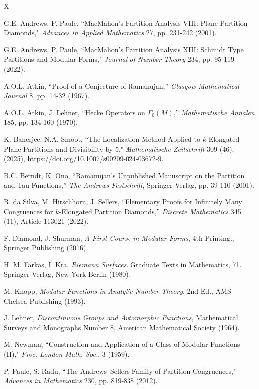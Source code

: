 \documentclass[reqno]{amsart}
\theoremstyle{definition}
\theoremstyle{remark}
\numberwithin{equation}{section}
\begin{document}
\begin{thebibliography}{X}

 G.E. Andrews, P. Paule, ``MacMahon's Partition Analysis VIII: Plane Partition Diamonds," \textit{Advances in Applied Mathematics} 27, pp. 231-242 (2001).

 G.E. Andrews, P. Paule, ``MacMahon's Partition Analysis XIII: Schmidt Type Partitions and Modular Forms," \textit{Journal of Number Theory} 234, pp. 95-119 (2022).

 A.O.L. Atkin, ``Proof of a Conjecture of Ramanujan,'' \textit{Glasgow Mathematical Journal} 8, pp. 14-32 (1967).

 A.O.L. Atkin, J. Lehner, ``Hecke Operators on $\Gamma_0(M)$,'' \textit{Mathematische Annalen} 185, pp. 134-160 (1970).

 K. Banerjee, N.A. Smoot, ``The Localization Method Applied to $k$-Elongated Plane Partitions and Divisibility by 5," \textit{Mathematische Zeitschrift} 309 (46), (2025), \url{https://doi.org/10.1007/s00209-024-03672-9}.

 B.C. Berndt, K. Ono, ``Ramanujan's Unpublished Manuscript on the Partition and Tau Functions,'' \textit{The Andrews Festschrift}, Springer-Verlag, pp. 39-110 (2001).

 R. da Silva, M. Hirschhorn, J. Sellers, ``Elementary Proofs for Infinitely Many Congruences for $k$-Elongated Partition Diamonds,'' \textit{Discrete Mathematics} 345 (11), Article 113021 (2022).

 F. Diamond, J. Shurman, \textit{A First Course in Modular Forms}, 4th Printing., Springer Publishing (2016).

 H. M. Farkas, I. Kra, \textit{Riemann Surfaces}. Graduate Texts in Mathematics, 71.
Springer-Verlag, New York-Berlin (1980).

 M. Knopp, \textit{Modular Functions in Analytic Number Theory}, 2nd Ed., AMS Chelsea Publishing (1993).

 J. Lehner, \textit{Discontinuous Groups and Automorphic Functions}, Mathematical Surveys and Monographs Number 8, American Mathematical Society (1964).

  M. Newman, ``Construction and Application of a Class of Modular Functions (II)," \textit{Proc. London Math. Soc.}, 3 (1959).

  P. Paule, S. Radu, ``The Andrews--Sellers Family of Partition Congruences," \textit{Advances in Mathematics} 230, pp. 819-838 (2012).


\end{thebibliography}
\end{document}
